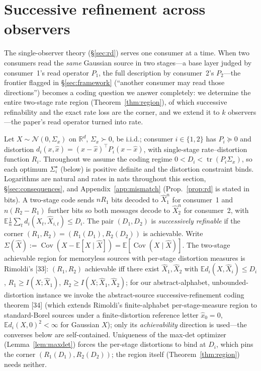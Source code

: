 \documentclass[lettersize,onecolumn]{IEEEtran}
\theoremstyle{definition}
\theoremstyle{remark}
\newcommand{\tr}{\operatorname{tr}}
\newcommand{\E}{\mathbb{E}}
\newcommand{\Cov}{\operatorname{Cov}}
\begin{document}
\section{Successive refinement across observers}\label{sec:multiobs}

The single-observer theory (\S\ref{sec:rd}) serves one consumer at a time. When two
consumers read the \emph{same} Gaussian source in two stages---a base layer judged by
consumer~1's read operator $P_1$, the full description by consumer~2's $P_2$---the
frontier flagged in \S\ref{sec:framework} (``another consumer may read those
directions'') becomes a coding question we answer completely: we determine the entire two-stage rate
region (Theorem~\ref{thm:region}), of which successive refinability and the exact rate
loss are the corner, and we extend it to $k$ observers---the paper's read operator turned
into rate.

Let $X\sim\mathcal N(0,\Sigma_x)$ on $\mathbb R^d$, $\Sigma_x\succ0$, be i.i.d.; consumer
$i\in\{1,2\}$ has $P_i\succeq0$ and distortion $d_i(x,\hat x)=(x-\hat x)^\top P_i
(x-\hat x)$, with single-stage rate--distortion function $R_i$. Throughout we assume the
coding regime $0<D_i<\tr(P_i\Sigma_x)$, so each optimum $\Sigma_i^\star$ (below) is
positive definite and the distortion constraint binds. Logarithms are natural and rates in
nats throughout this section, \S\ref{sec:consequences}, and Appendix~\ref{app:mismatch}
(Prop.~\ref{prop:rd} is stated in bits). A two-stage code sends
$nR_1$ bits decoded to $\hat X_1^n$ for consumer~1 and $n(R_2-R_1)$ further bits so both
messages decode to $\hat X_2^n$ for consumer~2, with $\E\tfrac1n\sum_t d_i(X_t,\hat
X_{i,t})\le D_i$. The pair $(D_1,D_2)$ is \emph{successively refinable} if the corner
$(R_1,R_2)=(R_1(D_1),R_2(D_2))$ is achievable. Write $\Sigma(\hat X):=\Cov(X-\E[X\mid
\hat X])=\E[\Cov(X\mid\hat X)]$. The two-stage achievable region for memoryless sources
with per-stage distortion measures is Rimoldi's [33]: $(R_1,R_2)$ achievable
iff there exist $\hat X_1,\hat X_2$ with $\E d_i(X,\hat X_i)\le D_i$, $R_1\ge
I(X;\hat X_1)$, $R_2\ge I(X;\hat X_1,\hat X_2)$; for our abstract-alphabet,
unbounded-distortion instance we invoke the abstract-source successive-refinement coding
theorem [34] (which extends Rimoldi's finite-alphabet per-stage-measure
region to standard-Borel sources under a finite-distortion reference letter $\hat x_0=0$,
$\E d_i(X,0)^2<\infty$ for Gaussian $X$); only its \emph{achievability} direction is
used---the converses below are self-contained. Uniqueness of the max-det optimizer
(Lemma~\ref{lem:maxdet}) forces the per-stage distortions to bind at $D_i$, which pins the
corner $(R_1(D_1),R_2(D_2))$; the region itself (Theorem~\ref{thm:region}) needs neither.
\end{document}
